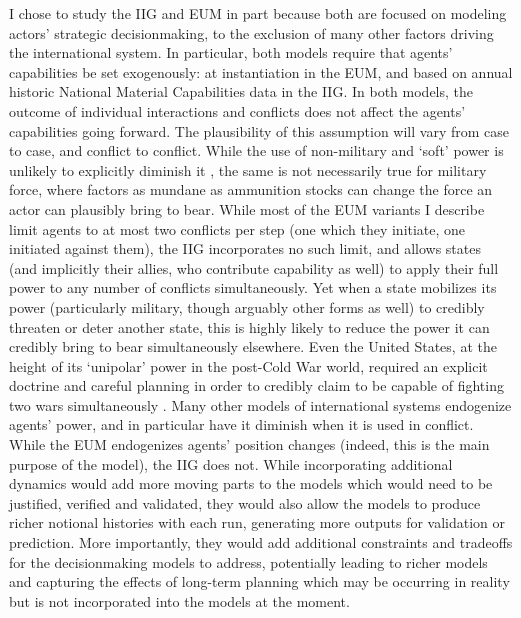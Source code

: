 I chose to study the IIG and EUM in part because both are focused on modeling actors' strategic decisionmaking, to the exclusion of many other factors driving the international system. In particular, both models require that agents' capabilities be set exogenously: at instantiation in the EUM, and based on annual historic National Material Capabilities data in the IIG. In both models, the outcome of individual interactions and conflicts does not affect the agents' capabilities going forward. The plausibility of this assumption will vary from case to case, and conflict to conflict. While the use of non-military and `soft' power is unlikely to explicitly diminish it \citep{nye_1990}, the same is not necessarily true for military force, where factors as mundane as ammunition stocks can change the force an actor can plausibly bring to bear. While most of the EUM variants I describe limit agents to at most two conflicts per step (one which they initiate, one initiated against them), the IIG incorporates no such limit, and allows states (and implicitly their allies, who contribute capability as well) to apply their full power to any number of conflicts simultaneously. Yet when a state mobilizes its power (particularly military, though arguably other forms as well) to credibly threaten or deter another state, this is highly likely to reduce the power it can credibly bring to bear simultaneously elsewhere. Even the United States, at the height of its `unipolar' power in the post-Cold War world, required an explicit doctrine and careful planning in order to credibly claim to be capable of fighting two wars simultaneously \citep{qdr_2006}. Many other models of international systems \citep[e.g.][]{axelrod_1997,cederman_1997,min_2002,taylor_2008} endogenize agents' power, and in particular have it diminish when it is used in conflict. While the EUM endogenizes agents' position changes (indeed, this is the main purpose of the model), the IIG does not. While incorporating additional dynamics would add more moving parts to the models which would need to be justified, verified and validated, they would also allow the models to produce richer notional histories with each run, generating more outputs for validation or prediction. More importantly, they would add additional constraints and tradeoffs for the decisionmaking models to address, potentially leading to richer models and capturing the effects of long-term planning which may be occurring in reality but is not incorporated into the models at the moment.

